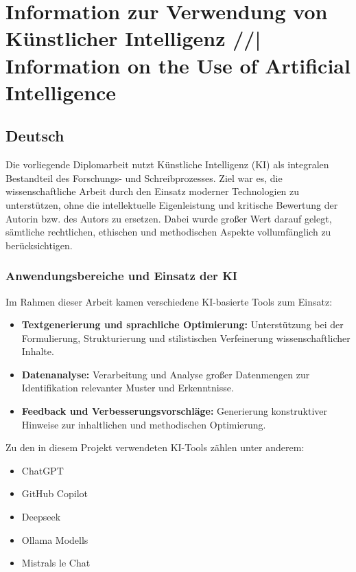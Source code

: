 \chapter{Information zur Verwendung von Künstlicher Intelligenz //| Information on the Use of Artificial Intelligence}
\label{cha:Use-of-AI}

\section*{Deutsch}
Die vorliegende Diplomarbeit nutzt Künstliche Intelligenz (KI) als integralen Bestandteil des Forschungs- und Schreibprozesses. Ziel war es, die wissenschaftliche Arbeit durch den Einsatz moderner Technologien zu unterstützen, ohne die intellektuelle Eigenleistung und kritische Bewertung der Autorin bzw. des Autors zu ersetzen. Dabei wurde großer Wert darauf gelegt, sämtliche rechtlichen, ethischen und methodischen Aspekte vollumfänglich zu berücksichtigen.

\subsection*{Anwendungsbereiche und Einsatz der KI}
Im Rahmen dieser Arbeit kamen verschiedene KI-basierte Tools zum Einsatz:
\begin{itemize}
    \item \textbf{Textgenerierung und sprachliche Optimierung:} Unterstützung bei der Formulierung, Strukturierung und stilistischen Verfeinerung wissenschaftlicher Inhalte. 
    \item \textbf{Datenanalyse:} Verarbeitung und Analyse großer Datenmengen zur Identifikation relevanter Muster und Erkenntnisse.
    \item \textbf{Feedback und Verbesserungsvorschläge:} Generierung konstruktiver Hinweise zur inhaltlichen und methodischen Optimierung.
\end{itemize}

\newpage

Zu den in diesem Projekt verwendeten KI-Tools zählen unter anderem:
\begin{itemize}
    \item ChatGPT
    \item GitHub Copilot
    \item Deepseek
    \item Ollama Modells
    \item Mistrals le Chat
\end{itemize}

